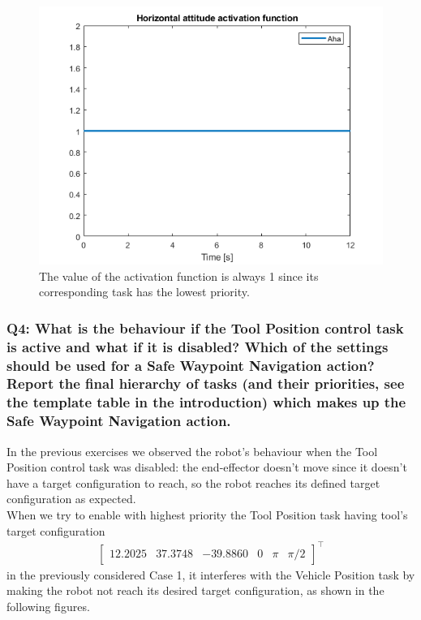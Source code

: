 \documentclass{article}
\begin{document}
\begin{figure}[H]
	\centering
	\includegraphics[width=0.7\linewidth]{images/Ex1/HorAtt_LowPrio_DifferentStartpos_DifferentEndpos_ActivFunct}
	\caption{The value of the activation function is always 1 since its corresponding task has the lowest priority.}
	\label{fig:q3case3d}
\end{figure}


\subsubsection{Q4: What is the behaviour if the Tool Position control task is active and what if it is disabled? Which of the settings should be used for a Safe Waypoint Navigation action? Report the final hierarchy of tasks (and their priorities, see the template table in the introduction) which makes up the Safe Waypoint Navigation action.}

In the previous exercises we observed the robot's behaviour when the Tool Position control task was disabled: the end-effector doesn't move since it doesn't have a target configuration to reach, so the robot reaches its defined target configuration as expected. \\
When we try to enable with highest priority the Tool Position task having tool's target configuration
\begin{gather*}
	\begin{bmatrix} 12.2025 & 37.3748 & -39.8860 & 0 & \pi & \pi/2\end{bmatrix}^\top
\end{gather*}
in the previously considered Case 1, it interferes with the Vehicle Position task by making the robot not reach its desired target configuration, as shown in the following figures.
\end{document}
